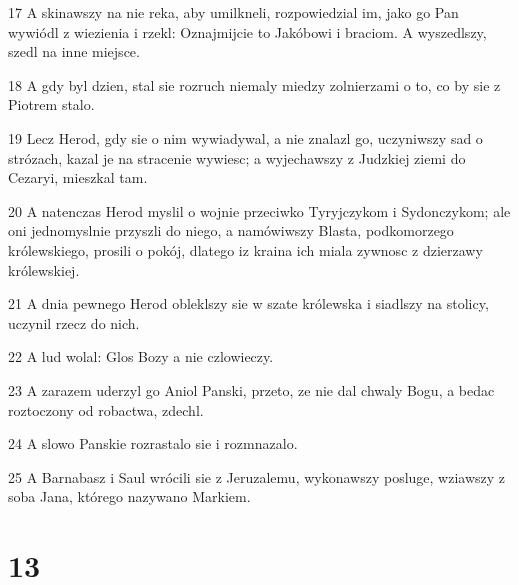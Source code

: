 \par 17 A skinawszy na nie reka, aby umilkneli, rozpowiedzial im, jako go Pan wywiódl z wiezienia i rzekl: Oznajmijcie to Jakóbowi i braciom. A wyszedlszy, szedl na inne miejsce.
\par 18 A gdy byl dzien, stal sie rozruch niemaly miedzy zolnierzami o to, co by sie z Piotrem stalo.
\par 19 Lecz Herod, gdy sie o nim wywiadywal, a nie znalazl go, uczyniwszy sad o strózach, kazal je na stracenie wywiesc; a wyjechawszy z Judzkiej ziemi do Cezaryi, mieszkal tam.
\par 20 A natenczas Herod myslil o wojnie przeciwko Tyryjczykom i Sydonczykom; ale oni jednomyslnie przyszli do niego, a namówiwszy Blasta, podkomorzego królewskiego, prosili o pokój, dlatego iz kraina ich miala zywnosc z dzierzawy królewskiej.
\par 21 A dnia pewnego Herod obleklszy sie w szate królewska i siadlszy na stolicy, uczynil rzecz do nich.
\par 22 A lud wolal: Glos Bozy a nie czlowieczy.
\par 23 A zarazem uderzyl go Aniol Panski, przeto, ze nie dal chwaly Bogu, a bedac roztoczony od robactwa, zdechl.
\par 24 A slowo Panskie rozrastalo sie i rozmnazalo.
\par 25 A Barnabasz i Saul wrócili sie z Jeruzalemu, wykonawszy posluge, wziawszy z soba Jana, którego nazywano Markiem.

\chapter{13}

